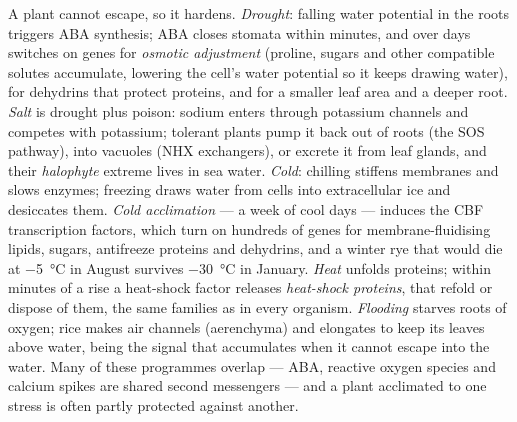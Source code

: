 \begin{definition}\label{def:b3:plant-molecular-physiology:abiotic}
A plant cannot escape, so it hardens. \emph{Drought}: falling water
potential in the roots triggers ABA synthesis; ABA closes stomata within
minutes, and over days switches on genes for \emph{osmotic adjustment}
(proline, sugars and other compatible solutes accumulate, lowering the
cell's water potential so it keeps drawing water), for dehydrins that
protect proteins, and for a smaller leaf area and a deeper root.
\emph{Salt} is drought plus poison: sodium enters through potassium
channels and competes with potassium; tolerant plants pump it back out
of roots (the SOS pathway), into vacuoles (NHX exchangers), or excrete it
from leaf glands, and their \emph{halophyte} extreme lives in sea water.
\emph{Cold}: chilling stiffens membranes and slows enzymes; freezing
draws water from cells into extracellular ice and desiccates them.
\emph{Cold acclimation} --- a week of cool days --- induces the CBF
transcription factors, which turn on hundreds of genes for
membrane-fluidising lipids, sugars, antifreeze proteins and dehydrins,
and a winter rye that would die at \qty{-5}{\celsius} in August survives
\qty{-30}{\celsius} in January. \emph{Heat} unfolds proteins; within
minutes of a rise a heat-shock factor releases \emph{heat-shock
proteins},  that refold or dispose of them, the same families
as in every organism. \emph{Flooding} starves roots of oxygen;
rice makes air channels (aerenchyma) and elongates to keep its leaves
above water,  being the signal that accumulates when it cannot
escape into the water. Many of these programmes overlap --- ABA, reactive
oxygen species and calcium spikes are shared second messengers --- and a
plant acclimated to one stress is often partly protected against
another.
\end{definition}

